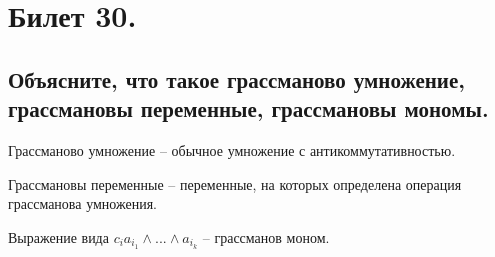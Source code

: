\section{Билет 30.}

\subsection{Объясните, что такое грассманово умножение, грассмановы переменные, грассмановы мономы.}
\begin{definition}
    Грассманово умножение -- обычное умножение с антикоммутативностью.
\end{definition}
\begin{definition}
    Грассмановы переменные -- переменные, на которых определена операция грассманова умножения.
\end{definition}
\begin{definition}
    Выражение вида $c_i a_{i_1} \wedge ... \wedge a_{i_k}$ -- грассманов моном.
\end{definition}